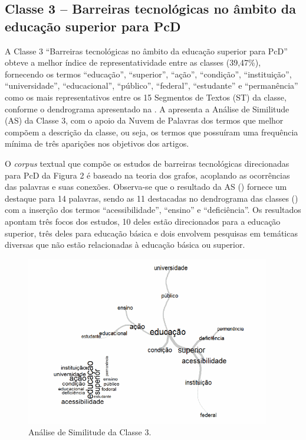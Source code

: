 \documentclass{textolivre}
\begin{document}
\subsection{Classe 3 – Barreiras tecnológicas no âmbito da educação superior para PcD}
A Classe 3 “Barreiras tecnológicas no âmbito da educação superior para PcD” obteve a melhor índice de representatividade entre as classes (39,47\%), fornecendo os termos “educação”, “superior”, “ação”, “condição”, “instituição”, “universidade”, “educacional”, “público”, “federal”, “estudante” e “permanência” como os mais representativos entre os 15 Segmentos de Textos (ST) da classe, conforme o dendrograma apresentado na . A  apresenta a Análise de Similitude (AS) da Classe 3, com o apoio da Nuvem de Palavras dos termos que melhor compõem a descrição da classe, ou seja, os termos que possuíram uma frequência mínima de três aparições nos objetivos dos artigos.

O \emph{corpus} textual que compõe os estudos de barreiras tecnológicas direcionadas para PcD da Figura 2 é baseado na teoria dos grafos, acoplando as ocorrências das palavras e suas conexões. Observa-se que o resultado da AS () fornece um destaque para 14 palavras, sendo as 11 destacadas no dendrograma das classes () com a inserção dos termos “acessibilidade”, “ensino” e “deficiência”. Os resultados apontam três focos dos estudos, 10 deles estão direcionados para a educação superior, três deles para educação básica e dois envolvem pesquisas em temáticas diversas que não estão relacionadas à educação básica ou superior.

\begin{figure}[htbp]
 \centering
 \includegraphics[width=0.95\textwidth]{fig2-32563.png}
 \caption{Análise de Similitude da Classe 3.}
 \label{fig2}
\end{figure}
\end{document}
